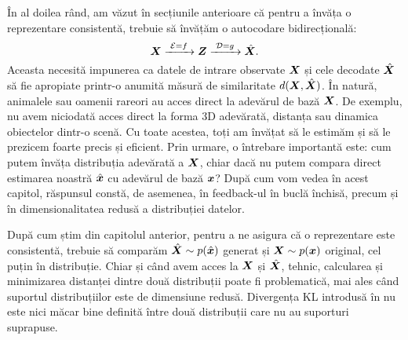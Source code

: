 \documentclass[../../book-main_ro.tex]{subfiles}
\begin{document}
În al doilea rând, am văzut în secțiunile anterioare că pentru a învăța o reprezentare consistentă, trebuie să învățăm o autocodare bidirecțională:
\begin{equation}
 \bm{X}
\xrightarrow{\hspace{1mm} \mathcal{E} = f \hspace{1mm}} \bm{Z}  \xrightarrow{\hspace{1mm} \mathcal{D} = g \hspace{1mm}} \hat{\bm{X}}.
\end{equation}
Aceasta necesită impunerea ca datele de intrare observate $\bm{X}$ și cele decodate $\hat {\bm{X}}$ să fie apropiate printr-o anumită măsură de similaritate $d(\bm{X}, \hat {\bm{X}})$. În natură, animalele sau oamenii rareori au acces direct la adevărul de bază $\bm{X}$. De exemplu, nu avem niciodată acces direct la forma 3D adevărată, distanța sau dinamica obiectelor dintr-o scenă. Cu toate acestea, toți am învățat să le estimăm și să le prezicem foarte precis și eficient. Prin urmare, o întrebare importantă este: cum putem învăța distribuția adevărată a $\bm{X}$, chiar dacă nu putem compara direct estimarea noastră $\hat {\bm{x}}$ cu adevărul de bază $\bm{x}$? După cum vom vedea în acest capitol, răspunsul constă, de asemenea, în feedback-ul în buclă închisă, precum și în dimensionalitatea redusă a distribuției datelor.






După cum știm din capitolul anterior, pentru a ne asigura că o reprezentare este consistentă, trebuie să comparăm $\hat {\bm{X}} \sim p(\hat{\bm{x}})$ generat și $\bm{X} \sim p(\bm{x})$ original, cel puțin în distribuție. Chiar și când avem acces la $\bm{X}$ și $\hat {\bm{X}}$, tehnic, calcularea și minimizarea distanței dintre două distribuții poate fi problematică, mai ales când suportul distribuțiilor este de dimensiune redusă. Divergența KL introdusă în  nu este nici măcar bine definită între două distribuții care nu au suporturi suprapuse.
\end{document}

